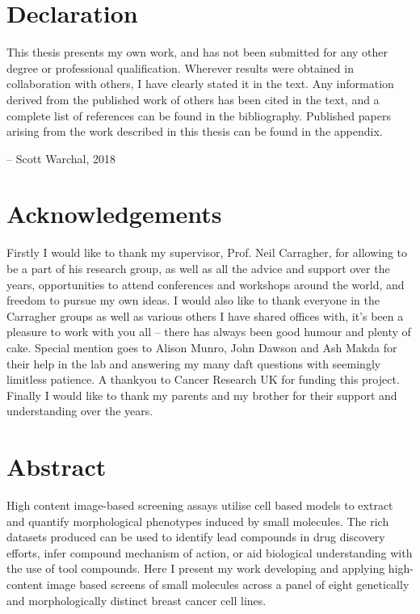 \documentclass[a4paper,11pt,twoside,openright]{scrbook}
\begin{document}
\chapter*{Declaration}

\setlength{\epigraphrule}{0pt}
\setlength{\epigraphwidth}{\textwidth}
\epigraph{\normalsize
This thesis presents my own work, and has not been submitted for any other degree or professional qualification.
Wherever results were obtained in collaboration with others, I have clearly stated it in the text.
Any information derived from the published work of others has been cited in the text, and a complete list of references 
can be found in the bibliography.
Published papers arising from the work described in this thesis can be found in the appendix.}
{\normalsize \vspace{0.8cm} -- Scott Warchal, 2018}


\chapter*{Acknowledgements}

Firstly I would like to thank my supervisor, Prof. Neil Carragher, for allowing to be a part of his research group, as 
well as all the advice and support over the years, opportunities to attend conferences and workshops around the world, 
and freedom to pursue my own ideas.
I would also like to thank everyone in the Carragher groups as well as various others I have shared offices with, it's 
been a pleasure to work with you all -- there has always been good humour and plenty of cake.
Special mention goes to Alison Munro, John Dawson and Ash Makda for their help in the lab and answering my many daft 
questions with seemingly limitless patience.
A thankyou to Cancer Research UK for funding this project.
Finally I would like to thank my parents and my brother for their support and understanding over the years.


\chapter*{Abstract}

High content image-based screening assays utilise cell based models to extract and quantify morphological phenotypes 
induced by small molecules.
The rich datasets produced can be used to identify lead compounds in drug discovery efforts, infer compound mechanism 
of action, or aid biological understanding with the use of tool compounds.
Here I present my work developing and applying high-content image based screens of small molecules across a panel of 
eight genetically and morphologically distinct breast cancer cell lines.
\end{document}
